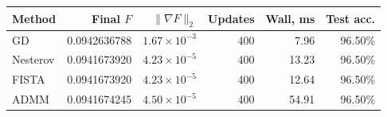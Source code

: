 \begin{center}
\small\setlength{\tabcolsep}{5pt}\renewcommand{\arraystretch}{1.3}
\begin{tabular}{lrrrrr}
\toprule
Method & Final $F$ & $\|\nabla F\|_2$ & Updates & Wall, ms & Test acc. \\
\midrule
GD & 0.0942636788 & $1.67\times10^{-3}$ & 400 & 7.96 & 96.50\% \\
Nesterov & 0.0941673920 & $4.23\times10^{-5}$ & 400 & 13.23 & 96.50\% \\
FISTA & 0.0941673920 & $4.23\times10^{-5}$ & 400 & 12.64 & 96.50\% \\
ADMM & 0.0941674245 & $4.50\times10^{-5}$ & 400 & 54.91 & 96.50\% \\
\bottomrule
\end{tabular}
\end{center}
